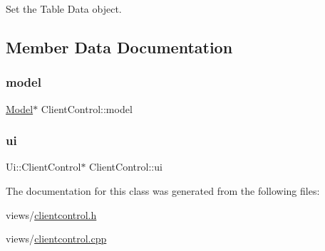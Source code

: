 Set the Table Data object. 



\subsection{Member Data Documentation}
\mbox{\label{classClientControl_a58fe6ae8049d307caa62f164a8c07eed}} 
\subsubsection{\texorpdfstring{model}{model}}
{\footnotesize\ttfamily \hyperlink{classModel}{Model}$\ast$ Client\+Control\+::model\hspace{0.3cm}{\ttfamily [private]}}

\mbox{\label{classClientControl_adea5f2cf529bedcc7d2aac9e2702d702}} 
\subsubsection{\texorpdfstring{ui}{ui}}
{\footnotesize\ttfamily Ui\+::\+Client\+Control$\ast$ Client\+Control\+::ui\hspace{0.3cm}{\ttfamily [private]}}



The documentation for this class was generated from the following files\+:\begin{DoxyCompactItemize}
\item 
views/\hyperlink{clientcontrol_8h}{clientcontrol.\+h}\item 
views/\hyperlink{clientcontrol_8cpp}{clientcontrol.\+cpp}\end{DoxyCompactItemize}
